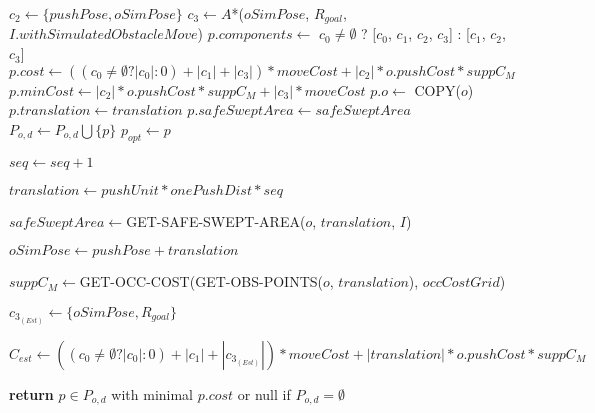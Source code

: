\begin{algorithm}[H]

  \label{alg:07-custom-merge-optimized-planforobstacle-part2}

  \begin{algorithmic}[1]



            \State $c_{2} \gets \{pushPose, oSimPose\}$
            \State $c_{3} \gets A$*($oSimPose$, $R_{goal}$, $I.withSimulatedObstacleMove$)
              \State $p.components \gets$ $c_{0} \neq \emptyset$ ? [$c_{0}$, $c_{1}$, $c_{2}$, $c_{3}$] : [$c_{1}$, $c_{2}$, $c_{3}$]
              \State $p.cost \gets ((c_{0} \neq \emptyset ? |c_{0}| : 0) + |c_{1}| + |c_{3}|) * moveCost + |c_{2}| * o.pushCost * suppC_{M}$
              \State $p.minCost \gets |c_{2}| * o.pushCost * suppC_{M} + |c_{3}| * moveCost$
              \State $p.o \gets$ COPY($o$)
              \State $p.translation \gets translation$
              \State $p.safeSweptArea \gets safeSweptArea$
              \State $P_{o,d} \gets P_{o,d} \bigcup \{p\}$
                \State $p_{opt} \gets p$
              \EndIf
            \EndIf

          \State $seq \gets seq + 1$

          \State $translation \gets pushUnit * onePushDist * seq$

          \State $safeSweptArea \gets $GET-SAFE-SWEPT-AREA($o$, $translation$, $I$)

          \State $oSimPose \gets pushPose + translation$

          \State $suppC_{M} \gets $GET-OCC-COST(GET-OBS-POINTS($o$, $translation$), $occCostGrid$)

          \State $c_{3_{(Est)}} \gets \{oSimPose, R_{goal}\}$

          \State $C_{est} \gets ((c_{0} \neq \emptyset ? |c_{0}| : 0) + |c_{1}| + |c_{3_{(Est)}}|) * moveCost + |translation| * o.pushCost * suppC_{M}$

        \EndWhile

      \EndFor

    \State \textbf{return} $p \in P_{o,d}$ with minimal $p.cost$ or null if $P_{o,d} = \emptyset$

    \EndProcedure

  \end{algorithmic}
\end{algorithm}
